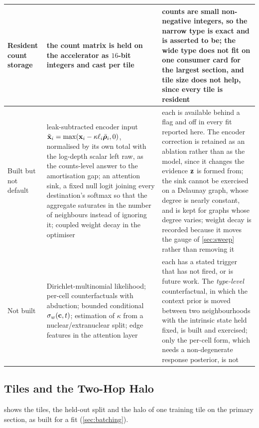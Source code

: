 \begin{table}[t]
\begin{tabular}{@{}p{}p{}p{}@{}}
Resident count storage & the count matrix is held on the accelerator as $16$-bit integers and cast per tile & counts are small non-negative integers, so the narrow type is exact and is asserted to be; the wide type does not fit on one consumer card for the largest section, and tile size does not help, since every tile is resident \\
\midrule
Built but not default & leak-subtracted encoder input $\tilde{\mathbf{x}}_i = \max(\mathbf{x}_i - \kappa\ell_i\bar{\boldsymbol{\rho}}_i, 0)$, normalised by its own total with the log-depth scalar left raw, as the counts-level answer to the amortisation gap; an attention sink, a fixed null logit joining every destination's softmax so that the aggregate saturates in the number of neighbours instead of ignoring it; coupled weight decay in the optimiser & each is available behind a flag and off in every fit reported here. The encoder correction is retained as an ablation rather than as the model, since it changes the evidence $\mathbf{z}$ is formed from; the sink cannot be exercised on a Delaunay graph, whose degree is nearly constant, and is kept for graphs whose degree varies; weight decay is recorded because it moves the gauge of \cref{sec:sweep} rather than removing it \\
\midrule
Not built & Dirichlet-multinomial likelihood; per-cell counterfactuals with abduction; bounded conditional $\sigma_w(\mathbf{c},t)$; estimation of $\kappa$ from a nuclear/extranuclear split; edge features in the attention layer & each has a stated trigger that has not fired, or is future work. The \emph{type-level} counterfactual, in which the context prior is moved between two neighbourhoods with the intrinsic state held fixed, is built and exercised; only the per-cell form, which needs a non-degenerate response posterior, is not \\
\bottomrule
\end{tabular}
\end{table}

\subsection{Tiles and the Two-Hop Halo}
\label{app:tiles}

 shows the tiles, the held-out split and the halo of one training tile on the primary section, as built for a fit (\cref{sec:batching}).

